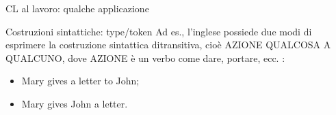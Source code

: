 \documentclass[pdf]{prosper}
\begin{document}
\begin{tsectionandpart}{CL al lavoro: qualche applicazione}
\begin{slide}{Costruzioni sintattiche: type/token}
Ad es., l'inglese possiede due modi di esprimere la costruzione sintattica ditransitiva, cioè AZIONE QUALCOSA A QUALCUNO, dove AZIONE è un verbo come dare, portare, ecc. :

	\begin{itemize}
	\item Mary gives a letter to John;
	\item Mary gives John a letter.
	\end{itemize}

\end{slide}


\end{tsectionandpart}



\end{document}
